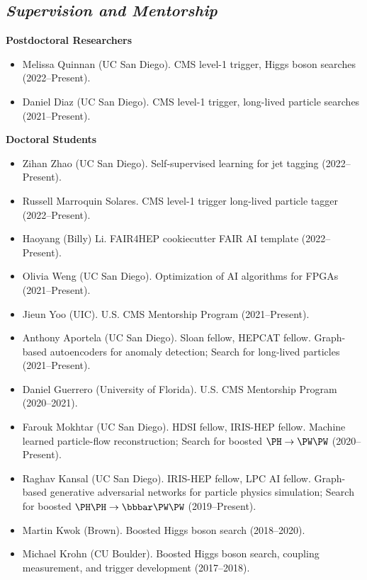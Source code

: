 \documentclass[11pt]{res}
\newcommand{\MarginText}[1]{\section{\textit{#1}}}
\begin{document}
\begin{resume}

  \MarginText{Supervision and Mentorship}

  \textbf{Postdoctoral Researchers}
  \begin{itemize}
    \itemsep-0.3em
    \item Melissa Quinnan (UC San Diego). CMS level-1 trigger, Higgs boson searches ({2022--Present}).
    \item Daniel Diaz (UC San Diego). CMS level-1 trigger, long-lived particle searches ({2021--Present}).
  \end{itemize}

  \textbf{Doctoral Students}
  \begin{itemize}
    \itemsep-0.3em
    \item Zihan Zhao (UC San Diego). Self-supervised learning for jet tagging ({2022--Present}).
    \item Russell Marroquin Solares. CMS level-1 trigger long-lived particle tagger ({2022--Present}).
    \item Haoyang (Billy) Li. FAIR4HEP cookiecutter FAIR AI template ({2022--Present}).
    \item Olivia Weng (UC San Diego). Optimization of AI algorithms for FPGAs ({2021--Present}).
    \item Jieun Yoo (UIC). U.S. CMS Mentorship Program ({2021--Present}).
    \item Anthony Aportela (UC San Diego). Sloan fellow, HEPCAT fellow. Graph-based autoencoders for anomaly detection; Search for long-lived particles ({2021--Present}).
    \item Daniel Guerrero (University of Florida). U.S. CMS Mentorship Program ({2020--2021}).
    \item Farouk Mokhtar (UC San Diego). HDSI fellow, IRIS-HEP fellow. Machine learned particle-flow reconstruction; Search for boosted $\PH\to\PW\PW$ ({2020--Present}).
    \item Raghav Kansal (UC San Diego). IRIS-HEP fellow, LPC AI fellow. Graph-based generative adversarial networks for particle physics simulation; Search for boosted $\PH\PH\to\bbbar\PW\PW$ ({2019--Present}).
    \item Martin Kwok (Brown). Boosted Higgs boson search ({2018--2020}).
    \item Michael Krohn (CU Boulder). Boosted Higgs boson search, coupling measurement, and trigger development ({2017--2018}).

\end{itemize}
\end{resume}
\end{document}
